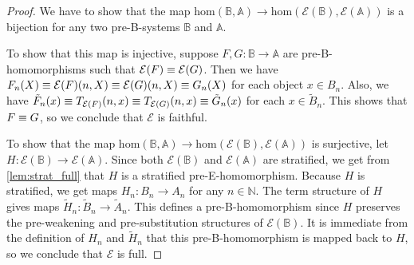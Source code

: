 \begin{proof}
We have to show that the map $\mathrm{hom}(\mathbb{B},\mathbb{A})\to
\mathrm{hom}(\mathcal{E}(\mathbb{B}),\mathcal{E}(\mathbb{A}))$ is a bijection
for any two pre-B-systems $\mathbb{B}$ and $\mathbb{A}$.

To show that this map is injective, suppose $F,G:\mathbb{B}\to\mathbb{A}$ are 
pre-B-homomorphisms such that $\mathcal{E}(F)\equiv\mathcal{E}(G)$. Then we have
$F_n(X)\equiv\mathcal{E}(F)(n,X)\equiv \mathcal{E}(G)(n,X)\equiv G_n(X)$ for each
object $x\in B_n$. Also, we have $\tilde{F}_n(x)\equiv T_{\mathcal{E}(F)}(n,x)
\equiv T_{\mathcal{E}(G)}(n,x)\equiv \tilde{G}_n(x)$ for each
$x\in\tilde{B}_n$. This shows that $F\equiv G$, so we conclude that $\mathcal{E}$
is faithful.  

To show that the map $\mathrm{hom}(\mathbb{B},\mathbb{A})\to
\mathrm{hom}(\mathcal{E}(\mathbb{B}),\mathcal{E}(\mathbb{A}))$ 
is surjective, let $H:\mathcal{E}(\mathbb{B})\to
\mathcal{E}(\mathbb{A})$. Since both $\mathcal{E}(\mathbb{B})$ and
$\mathcal{E}(\mathbb{A})$ are stratified, we get from
\autoref{lem:strat_full} that $H$ is a stratified pre-E-homomorphism. 
Because $H$ is stratified, we get maps $H_n:B_n\to A_n$ for any $n\in\mathbb{N}$.
The term structure of $H$ gives maps $\tilde{H}_n:
\tilde{B}_n\to\tilde{A}_n$. This defines a pre-B-homomorphism since $H$ 
preserves the pre-weakening and pre-substitution structures of $\mathcal{E}(\mathbb{B})$.
It is immediate from the definition of $H_n$ and
$\tilde{H}_n$ that this pre-B-homomorphism is mapped back to $H$, so we conclude
that $\mathcal{E}$ is full.
\end{proof}
